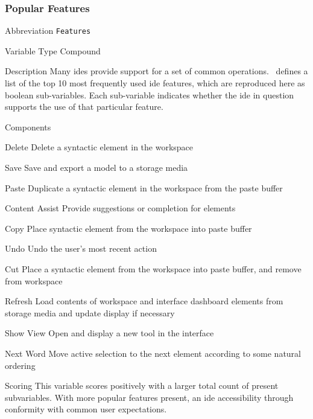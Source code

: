 \subsubsection{Popular Features}
\label{subsubsec:features}

\begin{AlignedDesc}
  \item[Abbreviation] \texttt{Features}

  \item[Variable Type] Compound

  \item[Description] Many \acp{ide} provide support for a set of common
  operations.~\cite{murphy2006} defines a list of the top 10 most
  frequently used \ac{ide} features, which are reproduced here as boolean
  sub-variables. Each sub-variable indicates whether the \ac{ide} in
  question supports the use of that particular feature.

  \item[Components]

  \begin{AlignedDesc}
    \item[Delete] Delete a syntactic element in the workspace
    \item[Save] Save and export a model to a storage media
    \item[Paste] Duplicate a syntactic element in the workspace from the
    paste buffer
    \item[Content Assist] Provide suggestions or completion for elements
    \item[Copy] Place syntactic element from the workspace into paste
    buffer
    \item[Undo] Undo the user's most recent action
    \item[Cut] Place a syntactic element from the workspace into paste
    buffer, and remove from workspace
    \item[Refresh] Load contents of workspace and interface dashboard
    elements from storage media and update display if necessary
    \item[Show View] Open and display a new tool in the interface
    \item[Next Word] Move active selection to the next element according to
    some natural ordering
  \end{AlignedDesc}

  \item[Scoring] This variable scores positively with a larger total count
  of present subvariables. With more popular features present, an \ac{ide}
  accessibility through conformity with common user expectations.

\end{AlignedDesc}

